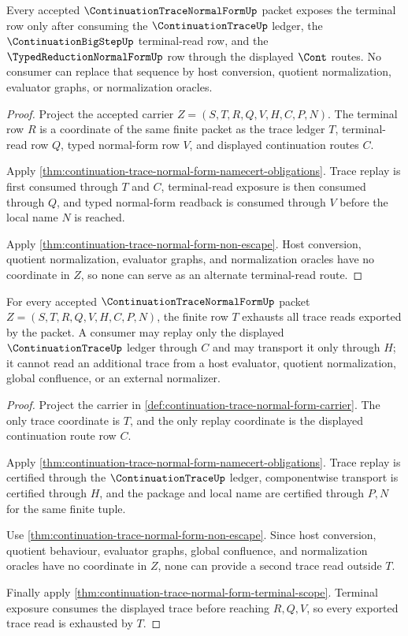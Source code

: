 \begin{theorem}
\label{thm:continuation-trace-normal-form-terminal-scope}
Every accepted $\ContinuationTraceNormalFormUp$ packet exposes the terminal row only after consuming the $\ContinuationTraceUp$ ledger, the $\ContinuationBigStepUp$ terminal-read row, and the $\TypedReductionNormalFormUp$ row through the displayed $\Cont$ routes. No consumer can replace that sequence by host conversion, quotient normalization, evaluator graphs, or normalization oracles.
\end{theorem}
\begin{proof}
Project the accepted carrier $Z=(S,T,R,Q,V,H,C,P,N)$. The terminal row $R$ is a coordinate of the same finite packet as the trace ledger $T$, terminal-read row $Q$, typed normal-form row $V$, and displayed continuation routes $C$.

Apply \autoref{thm:continuation-trace-normal-form-namecert-obligations}. Trace replay is first consumed through $T$ and $C$, terminal-read exposure is then consumed through $Q$, and typed normal-form readback is consumed through $V$ before the local name $N$ is reached.

Apply \autoref{thm:continuation-trace-normal-form-non-escape}. Host conversion, quotient normalization, evaluator graphs, and normalization oracles have no coordinate in $Z$, so none can serve as an alternate terminal-read route.
\end{proof}

\begin{theorem}
\label{thm:continuation-trace-normal-form-trace-ledger-exhaustion}
For every accepted $\ContinuationTraceNormalFormUp$ packet $Z=(S,T,R,Q,V,H,C,P,N)$, the finite row $T$ exhausts all trace reads exported by the packet. A consumer may replay only the displayed $\ContinuationTraceUp$ ledger through $C$ and may transport it only through $H$; it cannot read an additional trace from a host evaluator, quotient normalization, global confluence, or an external normalizer.
\end{theorem}
\begin{proof}
Project the carrier in \autoref{def:continuation-trace-normal-form-carrier}. The only trace coordinate is $T$, and the only replay coordinate is the displayed continuation route row $C$.

Apply \autoref{thm:continuation-trace-normal-form-namecert-obligations}. Trace replay is certified through the $\ContinuationTraceUp$ ledger, componentwise transport is certified through $H$, and the package and local name are certified through $P,N$ for the same finite tuple.

Use \autoref{thm:continuation-trace-normal-form-non-escape}. Since host conversion, quotient behaviour, evaluator graphs, global confluence, and normalization oracles have no coordinate in $Z$, none can provide a second trace read outside $T$.

Finally apply \autoref{thm:continuation-trace-normal-form-terminal-scope}. Terminal exposure consumes the displayed trace before reaching $R,Q,V$, so every exported trace read is exhausted by $T$.
\end{proof}

